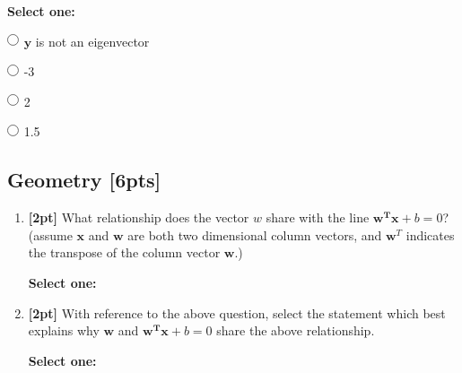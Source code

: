 \documentclass[12pt]{article}
\renewcommand{\circle}{\tikz\draw[black] (0,0) circle (1ex);}
\begin{document}
\begin{enumerate}
    \textbf{Select one:}
    \begin{list}{}
        \item $\circle$ $\mathbf{y}$ is not an eigenvector
        \item $\circle$ -3
        \item $\circle$ 2
        \item $\circle$ 1.5
    \end{list}


    \clearpage
\end{enumerate}




\subsection{Geometry [6pts]}
\begin{enumerate}
    \item \textbf{[2pt]} What relationship does the vector $w$ share with the line $\mathbf{w^Tx}+b = 0$?
    (assume $\mathbf{x}$ and $\mathbf{w}$ are both two dimensional column vectors, and $\mathbf{w}^T$ indicates the transpose of the column vector $\mathbf{w}$.)
    
    \textbf{Select one:}

    
    \item \textbf{[2pt]} With reference to the above question, select the statement which best explains why $\mathbf{w}$ and $\mathbf{w^Tx} + b = 0$ share the above relationship.
    
    \textbf{Select one:}


\end{enumerate}
\end{document}
